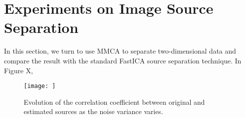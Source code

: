 \section{Experiments on Image Source Separation}
In this section, we turn to use MMCA to separate two-dimensional data and compare the result with the standard FastICA source separation technique. In Figure X,


\begin{figure}[H]
\centering
\texttt{[image: ]}
\caption{Evolution of the correlation coefficient between original and estimated sources as the noise variance varies.}
\label{imapint1}
\end{figure}
